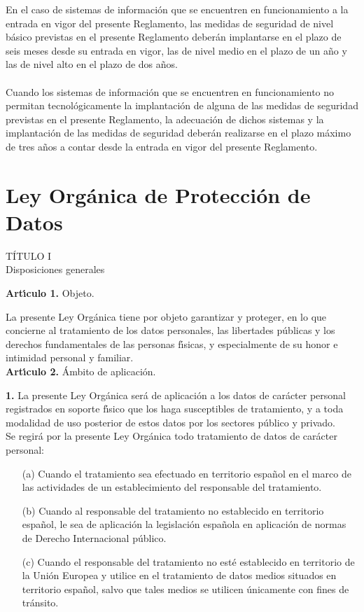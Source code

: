 En el caso de sistemas de informaci\'on que se encuentren en funcionamiento a 
la entrada en vigor del presente Reglamento, las medidas de seguridad de nivel 
b\'asico previstas en el presente Reglamento deber\'an implantarse en el plazo 
de seis meses desde su entrada en vigor, las de nivel medio en el plazo de un 
a\~no y las de nivel alto en el plazo de dos a\~nos.\\
\\Cuando los sistemas de informaci\'on que se encuentren en funcionamiento no 
permitan tecnol\'ogicamente la implantaci\'on de alguna de las medidas de 
seguridad previstas en el presente Reglamento, la adecuaci\'on de dichos 
sistemas y la implantaci\'on de las medidas de seguridad deber\'an realizarse 
en el plazo m\'aximo de tres a\~nos a contar desde la entrada en vigor del 
presente Reglamento.
\cleardoublepage
\section{Ley Org\'anica de Protecci\'on de Datos}
\begin{center}
{\LARGE T\'ITULO I}\\
{\large Disposiciones generales}
\end{center}
{\large {\bf Art\'{\i}culo 1.} Objeto.}

La presente Ley Org\'anica tiene por objeto garantizar y proteger, en lo que 
concierne al tratamiento de los datos personales, las libertades p\'ublicas y 
los derechos fundamentales de las personas f\'{\i}sicas, y especialmente de su 
honor e intimidad personal y familiar.
\vspace{0.3cm}\\
{\large {\bf Art\'{\i}culo 2.} \'Ambito de aplicaci\'on.}

{\bf 1.} La presente Ley Org\'anica ser\'a de aplicaci\'on a los datos de 
car\'acter personal registrados en soporte f\'{\i}sico que los haga 
susceptibles de tratamiento, y a toda modalidad de uso posterior de estos datos 
por los sectores p\'ublico y privado.\\
Se regir\'a por la presente Ley Org\'anica todo tratamiento de datos de 
car\'acter personal:
~\par
\begin{itemize}
\item[(a)] Cuando el tratamiento sea efectuado en territorio espa\~nol 
 en el marco de las actividades de un establecimiento del responsable del 
 tratamiento.
\item[(b)] Cuando al responsable del tratamiento no establecido en territorio 
espa\~nol, le sea de aplicaci\'on la legislaci\'on espa\~nola en aplicaci\'on 
de normas de Derecho Internacional p\'ublico.
\item[(c)] Cuando el responsable del tratamiento no est\'e establecido en 
territorio de la Uni\'on Europea y utilice en el tratamiento de datos medios 
situados en territorio espa\~nol, salvo que tales medios se utilicen 
\'unicamente con fines de tr\'ansito.
\end{itemize}


